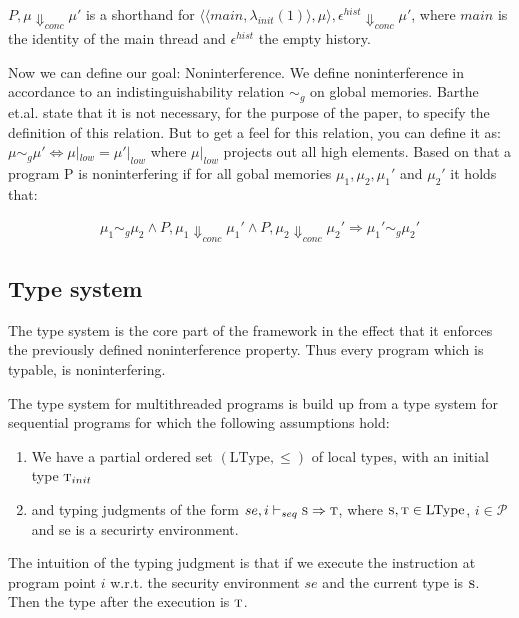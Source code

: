 \documentclass[a4paper,10pt]{llncs}
\begin{document}
$P, \mu \Downarrow_{conc} \mu'$ is a shorthand for $\langle\langle main,\lambda_{init}(1)\rangle,
\mu\rangle, \epsilon^{hist} \Downarrow_{conc} \mu'$, where $main$ is the identity of the main thread
and $\epsilon^{hist}$ the empty history.

Now we can define our goal: Noninterference. We define noninterference
in accordance to an indistinguishability relation $\sim_g$ on global memories.
Barthe et.al. state that it is not necessary, for the purpose of the paper,
to specify the definition of this relation. But to get a feel for this
relation, you can define it as: $\mu \sim_g \mu' \Leftrightarrow \mu|_{low} =
\mu'|_{low}$ where $\mu|_{low}$ projects out all high elements. Based on that
a program P is noninterfering if for all gobal memories $\mu_1, \mu_2, \mu_1'$
and $\mu_2'$ it holds that:

\begin{align*}
\mu_1 \sim_g \mu_2 \land P,\mu_1 \Downarrow_{conc} \mu_1' \land P,\mu_2 \Downarrow_{conc} \mu_2' \Rightarrow \mu_1' \sim_g \mu_2'
\end{align*}

\subsection{Type system}
\label{sec:typesystem}
The type system is the core part of the framework in the effect that it
enforces the previously defined noninterference property. Thus every
program which is typable, is noninterfering.

The type system for multithreaded programs is build up from a type system
for sequential programs for which the following assumptions hold:

\begin{enumerate}
\item We have a partial ordered set $(\text{LType}, \leq)$ of local types, with an initial
      type $\textsc{t}_{init}$
\item and typing judgments of the form $se, i \vdash_{seq} \textsc{s} \Rightarrow \textsc{t}$, where
      $\textsc{s}, \textsc{t} \in \text{LType}$, $i \in \mathcal{P}$ and se is a securirty environment.
\end{enumerate}

The intuition of the typing judgment is that if we execute the instruction at program
point $i$ w.r.t. the security environment $se$ and the current type is $\textsc{s}$. Then the
type after the execution is $\textsc{t}$.
\end{document}
